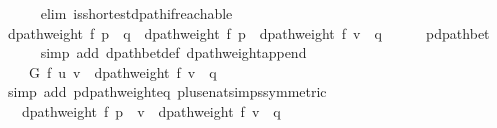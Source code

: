 \begin{isabellebody}
\ \ \ \ \isamarkupfalse%
\ {\isacharparenleft}{\kern0pt}elim\ is{\isacharunderscore}{\kern0pt}shortest{\isacharunderscore}{\kern0pt}dpath{\isacharunderscore}{\kern0pt}if{\isacharunderscore}{\kern0pt}reachable{\isacharparenright}{\kern0pt}\isanewline
\isanewline
\ \ \isamarkupfalse%
\ {\isachardoublequoteopen}dpath{\isacharunderscore}{\kern0pt}weight\ f\ {\isacharparenleft}{\kern0pt}p{\isacharprime}{\kern0pt}\ {\isacharat}{\kern0pt}\ q{\isacharparenright}{\kern0pt}\ {\isacharequal}{\kern0pt}\ dpath{\isacharunderscore}{\kern0pt}weight\ f\ p{\isacharprime}{\kern0pt}\ {\isacharplus}{\kern0pt}\ dpath{\isacharunderscore}{\kern0pt}weight\ f\ {\isacharparenleft}{\kern0pt}v\ {\isacharhash}{\kern0pt}\ q{\isacharparenright}{\kern0pt}{\isachardoublequoteclose}\isanewline
\ \ \ \ \isamarkupfalse%
\ p{\isacharprime}{\kern0pt}{\isacharunderscore}{\kern0pt}dpath{\isacharunderscore}{\kern0pt}bet\isanewline
\ \ \ \ \isamarkupfalse%
\ {\isacharparenleft}{\kern0pt}simp\ add{\isacharcolon}{\kern0pt}\ dpath{\isacharunderscore}{\kern0pt}bet{\isacharunderscore}{\kern0pt}def\ dpath{\isacharunderscore}{\kern0pt}weight{\isacharunderscore}{\kern0pt}append{\isacharparenright}{\kern0pt}\isanewline
\ \ \isamarkupfalse%
\ \isamarkupfalse%
\ {\isachardoublequoteopen}{\isachardot}{\kern0pt}{\isachardot}{\kern0pt}{\isachardot}{\kern0pt}\ {\isacharequal}{\kern0pt}\ {\isasymdelta}\ G\ f\ u\ v\ {\isacharplus}{\kern0pt}\ dpath{\isacharunderscore}{\kern0pt}weight\ f\ {\isacharparenleft}{\kern0pt}v\ {\isacharhash}{\kern0pt}\ q{\isacharparenright}{\kern0pt}{\isachardoublequoteclose}\isanewline
\ \ \ \ \isamarkupfalse%
\ {\isacharparenleft}{\kern0pt}simp\ add{\isacharcolon}{\kern0pt}\ p{\isacharprime}{\kern0pt}{\isacharunderscore}{\kern0pt}dpath{\isacharunderscore}{\kern0pt}weight{\isacharunderscore}{\kern0pt}eq{\isacharunderscore}{\kern0pt}{\isasymdelta}\ plus{\isacharunderscore}{\kern0pt}enat{\isacharunderscore}{\kern0pt}simps{\isacharparenleft}{\kern0pt}{}{\isacharparenright}{\kern0pt}{\isacharbrackleft}{\kern0pt}symmetric{\isacharbrackright}{\kern0pt}{\isacharparenright}{\kern0pt}\isanewline
\ \ \isamarkupfalse%
\ \isamarkupfalse%
\ {\isachardoublequoteopen}{\isachardot}{\kern0pt}{\isachardot}{\kern0pt}{\isachardot}{\kern0pt}\ {\isacharless}{\kern0pt}\ dpath{\isacharunderscore}{\kern0pt}weight\ f\ {\isacharparenleft}{\kern0pt}p\ {\isacharat}{\kern0pt}\ {\isacharbrackleft}{\kern0pt}v{\isacharbrackright}{\kern0pt}{\isacharparenright}{\kern0pt}\ {\isacharplus}{\kern0pt}\ dpath{\isacharunderscore}{\kern0pt}weight\ f\ {\isacharparenleft}{\kern0pt}v\ {\isacharhash}{\kern0pt}\ q{\isacharparenright}{\kern0pt}{\isachardoublequoteclose}\isanewline

\end{isabellebody}
